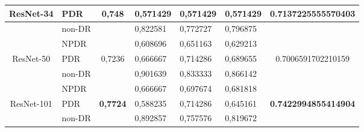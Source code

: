 \begin{table}[hbtp]
\begin{center}
\begin{tabular}{|c|l|c|l|l|l|c|}
			\multirow{-3}{*}{ResNet-34}  & PDR                                                & \multirow{-3}{*}{0,748}  & 0,571429                                          & 0,571429                                         & 0,571429                                        & \multirow{-3}{*}{0.7137225555570403} \\ \hline
			& non-DR                                             &                          & 0,822581                                          & 0,772727                                         & 0,796875                                        &                                      \\ \cline{2-2} \cline{4-6}
			& NPDR                                               &                          & 0,608696                                          & 0,651163                                         & 0,629213                                        &                                      \\ \cline{2-2} \cline{4-6}
			\multirow{-3}{*}{ResNet-50}  & PDR                                                & \multirow{-3}{*}{0,7236} & 0,666667                                          & 0,714286                                         & 0,689655                                        & \multirow{-3}{*}{0.7006591702210159} \\ \hline
			& non-DR                                             &                          & 0,901639                                          & 0,833333                                         & 0,866142                                        &                                      \\ \cline{2-2} \cline{4-6}
			& NPDR                                               &                          & 0,666667                                          & 0,697674                                         & 0,681818                                        &                                      \\ \cline{2-2} \cline{4-6}
			\multirow{-3}{*}{ResNet-101} & PDR                                                & \multirow{-3}{*}{\textbf{0,7724}} & 0,588235                                 & 0,714286                                         & 0,645161                                        & \multirow{-3}{*}{\textbf{0.7422994855414904}} \\ \hline
			& non-DR                                             &                          & 0,892857                                          & 0,757576                                         & 0,819672                                        &                                      \\ \cline{2-2} \cline{4-6}

\end{tabular}
\end{center}
\end{table}
